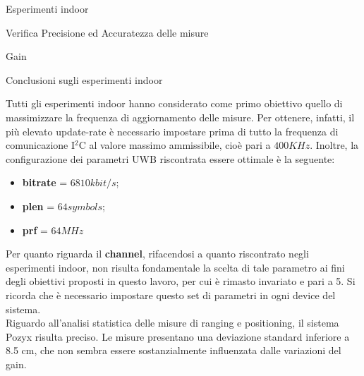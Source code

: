 \documentclass[12pt]{report}
\begin{document}
\begin{section}{Esperimenti indoor}
\begin{subsection}{Verifica Precisione ed Accuratezza delle misure}
\begin{subsubsection}{Gain}
		\newpage		
		\end{subsubsection}

		\end{subsection}

		\begin{subsection}{Conclusioni sugli esperimenti indoor}

				Tutti gli esperimenti indoor hanno considerato come primo obiettivo quello di massimizzare la frequenza di aggiornamento delle misure. Per ottenere, infatti, il più elevato update-rate è necessario impostare prima di tutto la frequenza di comunicazione I$^2$C al valore massimo ammissibile, cioè pari a 
				$400KHz$. Inoltre, la configurazione dei parametri UWB riscontrata essere ottimale è la seguente: 
				\begin{itemize}
					\item \textbf{bitrate} =  $6810kbit/s$; 
					\item \textbf{plen} = $64 symbols$;
					\item \textbf{prf} = $64MHz$
				\end{itemize}
				Per quanto riguarda il \textbf{channel}, rifacendosi a quanto riscontrato negli esperimenti indoor, non risulta fondamentale la scelta di tale parametro ai fini degli obiettivi proposti in questo lavoro, per cui è rimasto invariato e pari a 5. Si ricorda che è necessario impostare questo set di parametri in ogni 							device del sistema.\\ Riguardo all’analisi statistica delle misure di ranging e positioning, il sistema Pozyx risulta preciso.  Le misure presentano una deviazione standard inferiore a 8.5 cm, che non sembra essere sostanzialmente influenzata dalle variazioni del gain.

		\end{subsection}

	\end{section}
	\newpage
	
\end{document}
